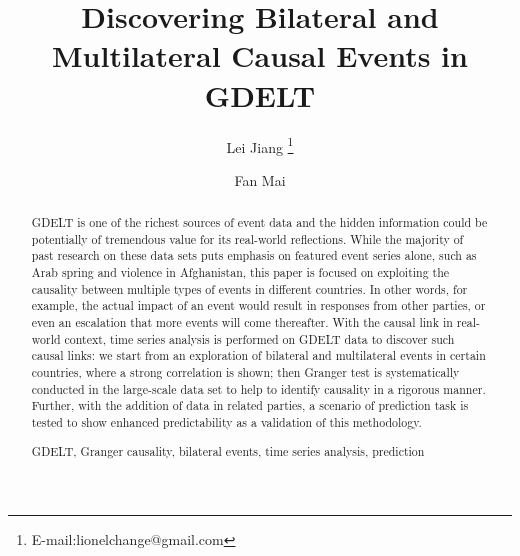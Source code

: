 \documentclass[runningheads,a4paper]{llncs}
\newcommand{\keywords}[1]{\par\addvspace\baselineskip
\noindent\keywordname\enspace\ignorespaces#1}
\begin{document}
\mainmatter  %

\title{Discovering Bilateral and Multilateral Causal Events in GDELT}


%
%
\author{Lei Jiang
\thanks{E-mail:lionelchange@gmail.com}%
\and Fan Mai
}
%


%
%

\maketitle


\begin{abstract}
GDELT is one of the richest sources of event data and the hidden information could be potentially of tremendous value for its real-world reflections. While the majority of past research on these data sets puts emphasis on featured event series alone, such as Arab spring and violence in Afghanistan, this paper is focused on exploiting the causality between multiple types of events in different countries. In other words, for example, the actual impact of an event would result in responses from other parties, or even an escalation that more events will come thereafter. With the causal link in real-world context, time series analysis is performed on GDELT data to discover such causal links: we start from an exploration of bilateral and multilateral events in certain countries, where a strong correlation is shown; then Granger test is systematically conducted in the large-scale data set to help to identify causality in a rigorous manner. Further, with the addition of data in related parties, a scenario of prediction task is tested to show enhanced predictability as a validation of this methodology.
\keywords{GDELT, Granger causality, bilateral events, time series analysis, prediction}
\end{abstract}
\end{document}
